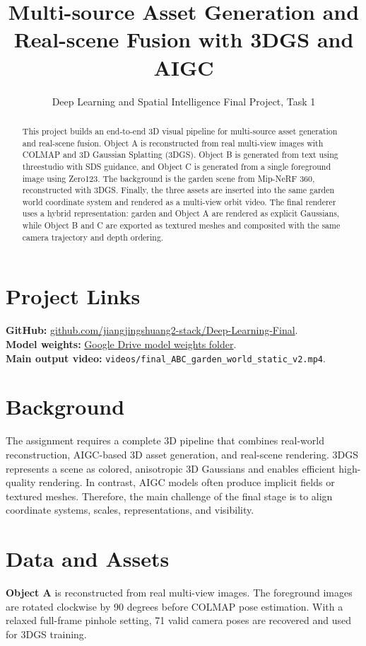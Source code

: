 \documentclass[11pt]{article}
\title{Multi-source Asset Generation and Real-scene Fusion with 3DGS and AIGC}
\author{Deep Learning and Spatial Intelligence Final Project, Task 1}
\date{}
\begin{document}
\maketitle

\begin{abstract}
This project builds an end-to-end 3D visual pipeline for multi-source asset generation and real-scene fusion. Object A is reconstructed from real multi-view images with COLMAP and 3D Gaussian Splatting (3DGS). Object B is generated from text using threestudio with SDS guidance, and Object C is generated from a single foreground image using Zero123. The background is the garden scene from Mip-NeRF 360, reconstructed with 3DGS. Finally, the three assets are inserted into the same garden world coordinate system and rendered as a multi-view orbit video. The final renderer uses a hybrid representation: garden and Object A are rendered as explicit Gaussians, while Object B and C are exported as textured meshes and composited with the same camera trajectory and depth ordering.
\end{abstract}

\section{Project Links}
\textbf{GitHub:} \href{https://github.com/jiangjingshuang2-stack/Deep-Learning-Final}{github.com/jiangjingshuang2-stack/Deep-Learning-Final}.\\
\textbf{Model weights:} \href{https://drive.google.com/drive/folders/154-pIcfsTkYXpTeUgTcfOjBJ5Sep0xIy?dmr=1&ec=wgc-drive-%5Bmodule%5D-goto}{Google Drive model weights folder}.\\
\textbf{Main output video:} \texttt{videos/final\_ABC\_garden\_world\_static\_v2.mp4}.

\section{Background}
The assignment requires a complete 3D pipeline that combines real-world reconstruction, AIGC-based 3D asset generation, and real-scene rendering. 3DGS represents a scene as colored, anisotropic 3D Gaussians and enables efficient high-quality rendering. In contrast, AIGC models often produce implicit fields or textured meshes. Therefore, the main challenge of the final stage is to align coordinate systems, scales, representations, and visibility.

\section{Data and Assets}
\textbf{Object A} is reconstructed from real multi-view images. The foreground images are rotated clockwise by 90 degrees before COLMAP pose estimation. With a relaxed full-frame pinhole setting, 71 valid camera poses are recovered and used for 3DGS training.
\end{document}
